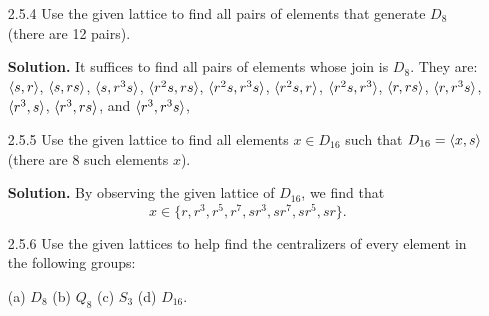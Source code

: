 \begin{enumerate}
      \textbf{Proof.} By Exercise 1.1.36, there is exactly one group, say $K$,
      of order 4 that has no element of order 4. Since
      $\cyc{s, r^2} = \{1, s, r^2, sr^2\}$, it follows that every non-identity
      element of $\cyc{s, r^2}$ has order 2, so that $\cyc{s, r^2} \cong K$.
      Similarly, the Klein-4 group has no element of order 4. Thus
      $V_4 \cong K$, and we conclude that $V_4 \cong \cyc{s, r^2}$. \qed
   \item[2.5.4]   Use the given lattice to find all pairs of elements that
                  generate $D_8$ (there are 12 pairs).
                  
      \textbf{Solution.} It suffices to find all pairs of elements whose join is
      $D_8$. They are: $\langle s, r \rangle$, $\langle s, rs \rangle$, $\langle s, r^3s \rangle$,
      $\langle r^2s, rs \rangle$, $\langle r^2s, r^3s \rangle$, $\langle r^2s, r \rangle$, $\langle r^2s, r^3 \rangle$,
      $\langle r, rs \rangle$, $\langle r, r^3s \rangle$,  $\langle r^3, s \rangle$, $\langle r^3, rs \rangle$, and
      $\langle r^3, r^3s \rangle$,
   \item[2.5.5]   Use the given lattice to find all elements $x \in D_{16}$
                  such that $D_{16} = \langle x, s \rangle$ (there are 8 such elements
                  $x$).
                  
      \textbf{Solution.} By observing the given lattice of $D_{16}$, we find
      that      
      $$x \in \{r, r^3, r^5, r^7, sr^3, sr^7, sr^5, sr\}.$$
   \item[2.5.6]   Use the given lattices to help find the centralizers of every
                  element in the following groups:

                  (a) $D_8$ \qquad (b) $Q_8$ \qquad
                  (c) $S_3$ \qquad (d) $D_{16}$.
                  

\end{enumerate}
